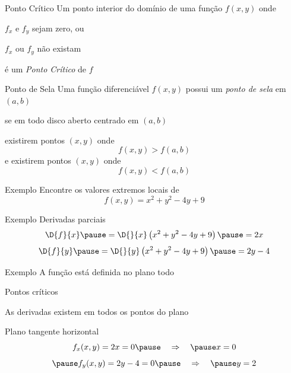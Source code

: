 \begin{frame}{Ponto Crítico}
  Um ponto interior do domínio de uma função \(f(x, y)\) onde

  \pause
  \vspace{\baselineskip}
  \(f_x\) e \(f_y\) sejam zero, ou

  \pause
  \vspace{\baselineskip}
  \(f_x\) ou \(f_y\) não existam

  \pause
  \vspace{\baselineskip}
  é um \emph{Ponto Crítico} de $f$
\end{frame}

\begin{frame}{Ponto de Sela}
  Uma função diferenciável \(f(x, y)\) possui um \emph{ponto de sela} em \((a, b)\)

  \pause
  \vspace{\baselineskip}
  se em todo disco aberto centrado em \((a, b)\)

  \pause
  \vspace{\baselineskip}
  existirem pontos \((x, y)\) onde
  \[
    f(x, y) > f(a, b)
  \]
  \pause
  e existirem pontos \((x, y)\) onde
  \[
    f(x, y) < f(a, b)
  \]
\end{frame}

\addtocounter{exemplo}{1}
\begin{frame}{Exemplo \theexemplo}
  Encontre os valores extremos locais de
  \[
     f(x, y) = x^2 + y^2 - 4y + 9
  \]
\end{frame}

\begin{frame}{Exemplo \theexemplo}
  Derivadas parciais
  \pause
  \vspace{\baselineskip}
  \[
    \D{f}{x}
    \pause
    = \D{}{x}\left(x^2 + y^2 - 4y + 9\right)
    \pause
    = 2x
  \]
  \pause
  \vspace{\baselineskip}
  \[
    \D{f}{y}
    \pause
    = \D{}{y}\left(x^2 + y^2 - 4y + 9\right)
    \pause
    = 2y -4
  \]
\end{frame}

\begin{frame}{Exemplo \theexemplo}
  A função está definida no plano todo

  \pause
  \vspace{\baselineskip}
  Pontos críticos

  \pause
  \vspace{\baselineskip}
  As derivadas existem em todos os pontos do plano

  \pause
  \vspace{\baselineskip}
  Plano tangente horizontal
  \[
    f_x(x, y) = 2x = 0
    \pause
    \quad\Rightarrow\quad
    \pause
    x = 0
  \]
  \[
    \pause
    f_y(x, y) = 2y -4 = 0
    \pause
    \quad\Rightarrow\quad
    \pause
    y = 2
  \]
\end{frame}

